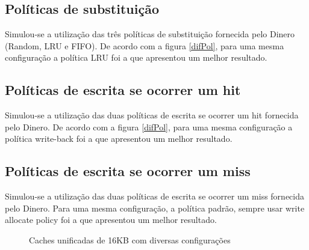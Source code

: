 \documentclass[12pt,a4paper]{article}
\begin{document}
\subsection{Políticas de substituição}
Simulou-se a utilização das três políticas de substituição fornecida
pelo Dinero (Random, LRU e FIFO).
De acordo com a figura \ref{difPol}, para uma mesma configuração a política LRU foi a que apresentou um
melhor resultado.

\subsection{Políticas de escrita se ocorrer um hit}
Simulou-se a utilização das duas políticas de escrita se ocorrer um
hit fornecida pelo Dinero.
De acordo com a figura \ref{difPol}, para uma mesma configuração a política write-back foi a que apresentou um
melhor resultado.

\subsection{Políticas de escrita se ocorrer um miss}
Simulou-se a utilização das duas políticas de escrita se ocorrer um
miss fornecida pelo Dinero.
Para uma mesma configuração, a política padrão, sempre usar write allocate policy foi a que apresentou um
melhor resultado.

\begin{figure}[h!]
\caption{Caches unificadas de 16KB com diversas configurações}
\end{figure}
\end{document}
